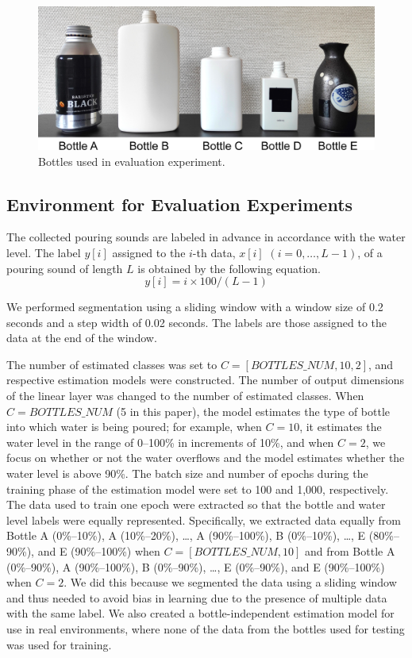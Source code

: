 \documentclass[sigconf]{acmart}
\begin{document}
\begin{figure}[!t]
  \centering
  \includegraphics[width=1\linewidth]{figures/bottles.eps}
  \caption{Bottles used in evaluation experiment.}
  \label{fig:bottles}
\end{figure}


\subsection{Environment for Evaluation Experiments}
The collected pouring sounds are labeled in advance in accordance with the water level. The label $y[i]$ assigned to the $i$-th data, $x[i]$ $(i=0,\dots,L-1)$, of a pouring sound of length $L$ is obtained by the following equation.
\begin{equation}
  y[i]=i \times 100/(L-1)
\end{equation}

We performed segmentation using a sliding window with a window size of 0.2 seconds and a step width of 0.02 seconds. The labels are those assigned to the data at the end of the window.\par

The number of estimated classes was set to $C=[BOTTLES\_NUM,10,2]$, and respective estimation models were constructed. The number of output dimensions of the linear layer was changed to the number of estimated classes. When $C=BOTTLES\_NUM$ (5 in this paper), the model estimates the type of bottle into which water is being poured; for example, when $C=10$, it estimates the water level in the range of 0--100\% in increments of 10\%, and when $C=2$, we focus on whether or not the water overflows and the model estimates whether the water level is above 90\%. The batch size and number of epochs during the training phase of the estimation model were set to 100 and 1,000, respectively. The data used to train one epoch were extracted so that the bottle and water level labels were equally represented. Specifically, we extracted data equally from Bottle A (0\%--10\%), A (10\%--20\%), \dots, A (90\%--100\%), B (0\%--10\%), \dots, E (80\%--90\%), and E (90\%--100\%) when $C=[BOTTLES\_NUM,10]$ and from Bottle A (0\%--90\%), A (90\%--100\%), B (0\%--90\%), \dots, E (0\%--90\%), and E (90\%--100\%) when $C=2$. We did this because we segmented the data using a sliding window and thus needed to avoid bias in learning due to the presence of multiple data with the same label. We also created a bottle-independent estimation model for use in real environments, where none of the data from the bottles used for testing was used for training.
\end{document}
